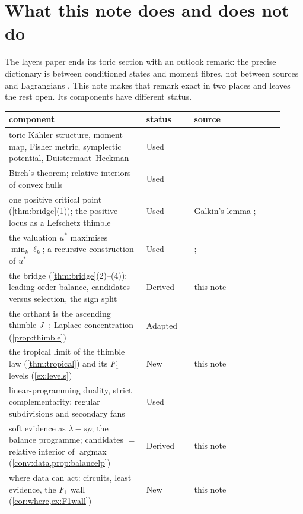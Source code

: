 \documentclass[11pt]{article}
\theoremstyle{definition}\newtheorem{definition}[theorem]{Definition}\newtheorem{remark}[theorem]{Remark}\newtheorem{example}[theorem]{Example}\newtheorem{problem}[theorem]{Open problem}\crefname{problem}{Problem}{Problems}
\begin{document}
\section{What this note does and does not do}
The layers paper ends its toric section with an outlook remark: the precise dictionary is between conditioned states and moment fibres,
not between sources and Lagrangians \cite[Remark ``outlook: a symplectic reading'']{Layers}. This note makes that remark exact in two places
and leaves the rest open. Its components have different status.
{\footnotesize
\begin{longtable}{p{0.46\linewidth}p{0.16\linewidth}p{0.3\linewidth}}\toprule
component & status & source\\\midrule\endhead
\rowcolor{stUsed} toric K\"ahler structure, moment map, Fisher metric, symplectic potential, Duistermaat--Heckman & Used & \cite{Guillemin1994,Abreu2003,DuistermaatHeckman1982,AmariNagaoka2000}\\
\rowcolor{stUsed} Birch's theorem; relative interiors of convex hulls & Used & \cite{Birch1963,Rockafellar1970}\\
\rowcolor{stUsed} one positive critical point (\cref{thm:bridge}(1)); the positive locus as a Lefschetz thimble & Used & Galkin's lemma \cite{Galkin2014}; \cite{GGI2016,Iritani2009}\\
\rowcolor{stUsed} the valuation $u^*$ maximises $\min_k\ell_k$; a recursive construction of $u^*$ & Used & \cite[Thm.~1.2]{JuddRietsch2019}; \cite{FOOO2010}\\
\rowcolor{stDerived} the bridge (\cref{thm:bridge}(2)--(4)): leading-order balance, candidates versus selection, the sign split & Derived & this note\\
\rowcolor{stAdapted} the orthant is the ascending thimble $J_+$; Laplace concentration (\cref{prop:thimble}) & Adapted & \cite{Galkin2014,GGI2016}\\
\rowcolor{stNew} the tropical limit of the thimble law (\cref{thm:tropical}) and its $F_1$ levels (\cref{ex:levels}) & New & this note\\
\rowcolor{stUsed} linear-programming duality, strict complementarity; regular subdivisions and secondary fans & Used & \cite{Schrijver1986,GKZ1994,MaclaganSturmfels2015}\\
\rowcolor{stDerived} soft evidence as $\lambda-s\rho$; the balance programme; candidates $=$ relative interior of $\operatorname{argmax}$ (\cref{conv:data,prop:balancelp}) & Derived & this note\\
\rowcolor{stNew} where data can act: circuits, least evidence, the $F_1$ wall (\cref{cor:where,ex:F1wall}) & New & this note\\

\end{longtable}}
\end{document}
